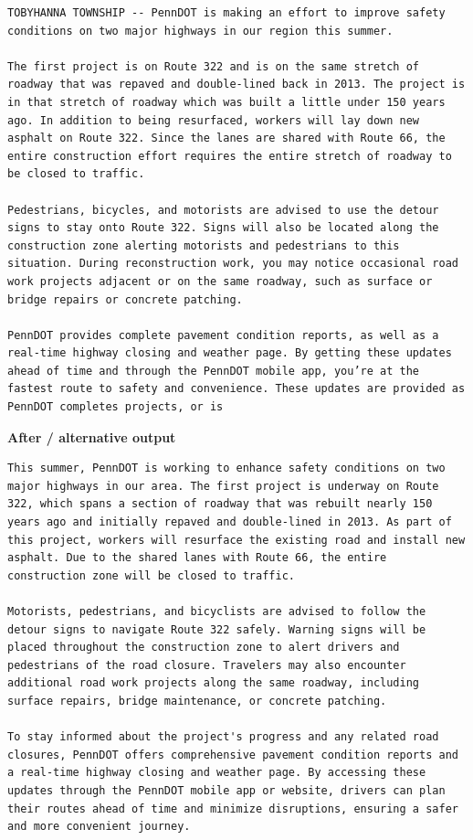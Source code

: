 \begin{Verbatim}
TOBYHANNA TOWNSHIP -- PennDOT is making an effort to improve safety conditions on two major highways in our region this summer.

The first project is on Route 322 and is on the same stretch of roadway that was repaved and double-lined back in 2013. The project is in that stretch of roadway which was built a little under 150 years ago. In addition to being resurfaced, workers will lay down new asphalt on Route 322. Since the lanes are shared with Route 66, the entire construction effort requires the entire stretch of roadway to be closed to traffic.

Pedestrians, bicycles, and motorists are advised to use the detour signs to stay onto Route 322. Signs will also be located along the construction zone alerting motorists and pedestrians to this situation. During reconstruction work, you may notice occasional road work projects adjacent or on the same roadway, such as surface or bridge repairs or concrete patching.

PennDOT provides complete pavement condition reports, as well as a real-time highway closing and weather page. By getting these updates ahead of time and through the PennDOT mobile app, you’re at the fastest route to safety and convenience. These updates are provided as PennDOT completes projects, or is
\end{Verbatim}

\textbf{After / alternative output}

\begin{Verbatim}
This summer, PennDOT is working to enhance safety conditions on two major highways in our area. The first project is underway on Route 322, which spans a section of roadway that was rebuilt nearly 150 years ago and initially repaved and double-lined in 2013. As part of this project, workers will resurface the existing road and install new asphalt. Due to the shared lanes with Route 66, the entire construction zone will be closed to traffic.

Motorists, pedestrians, and bicyclists are advised to follow the detour signs to navigate Route 322 safely. Warning signs will be placed throughout the construction zone to alert drivers and pedestrians of the road closure. Travelers may also encounter additional road work projects along the same roadway, including surface repairs, bridge maintenance, or concrete patching.

To stay informed about the project's progress and any related road closures, PennDOT offers comprehensive pavement condition reports and a real-time highway closing and weather page. By accessing these updates through the PennDOT mobile app or website, drivers can plan their routes ahead of time and minimize disruptions, ensuring a safer and more convenient journey.
\end{Verbatim}

